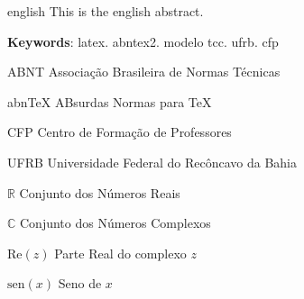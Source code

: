 \begin{resumo}[Abstract]
 \begin{otherlanguage*}{english}
   This is the english abstract.

   \vspace{\onelineskip}
 
   \noindent 
   \textbf{Keywords}: latex. abntex2. modelo tcc. ufrb. cfp
 \end{otherlanguage*}
\end{resumo}



\listoffigures*
\cleardoublepage


\listofquadros*
\cleardoublepage


\listoftables*
\cleardoublepage


\begin{siglas}
  \item[ABNT] Associação Brasileira de Normas Técnicas
  \item[abnTeX] ABsurdas Normas para TeX
  \item[CFP] Centro de Formação de Professores
  \item[UFRB] Universidade Federal do Recôncavo da Bahia
\end{siglas}


\begin{simbolos}
  \item[$ \mathbb{R} $] Conjunto dos Números Reais
  \item[$ \mathbb{C} $] Conjunto dos Números Complexos
  \item[$ \mathrm{Re}(z) $] Parte Real do complexo $ z $
  \item[$ \mathrm{sen} (x) $] Seno de $ x $ 
\end{simbolos}

\tableofcontents*
\cleardoublepage

